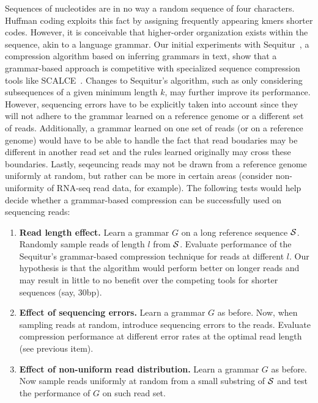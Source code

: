 \documentclass[12pt]{cmuthesis}
\begin{document}
  Sequences of nucleotides are in no way a random sequence of four characters. Huffman coding exploits this fact by assigning frequently appearing kmers shorter codes. However, it is conceivable that higher-order organization exists within the sequence, akin to a language grammar. Our initial experiments with Sequitur~\cite{Sequitur}, a compression algorithm based on inferring grammars in text, show that a grammar-based approach is competitive with specialized sequence compression tools like SCALCE~\cite{Sahinalp2012}. Changes to Sequitur's algorithm, such as only considering subsequences of a given minimum length $k$, may further improve its performance. However, sequencing errors have to be explicitly taken into account since they will not adhere to the grammar learned on a reference genome or a different set of reads. Additionally, a grammar learned on one set of reads (or on a reference genome) would have to be able to handle the fact that read boudaries may be different in another read set and the rules learned originally may cross these boundaries. Lastly, seqeuncing reads may not be drawn from a reference genome uniformly at random, but rather can be  more in certain areas (consider non-uniformity of RNA-seq read data, for example). The following tests would help decide whether a grammar-based compression can be successfully used on sequencing reads:
  \begin{enumerate}
    \item \textbf{Read length effect.} Learn a grammar $G$ on a long reference sequence $\mathcal{S}$. Randomly sample reads of length $l$ from $\mathcal{S}$. Evaluate performance of the Sequitur's grammar-based compression technique for reads at different $l$. Our hypothesis is that the algorithm would perform better on longer reads and may result in little to no benefit over the competing tools for shorter sequences (say, 30bp).

    \item \textbf{Effect of sequencing errors.} Learn a grammar $G$ as before. Now, when sampling reads at random, introduce sequencing errors to the reads. Evaluate compression performance at different error rates at the optimal read length (see previous item).

    \item \textbf{Effect of non-uniform read distribution.} Learn a grammar $G$ as before. Now sample reads uniformly at random from a small substring of $\mathcal{S}$ and test the performance of $G$ on such read set.
  \end{enumerate}
\end{document}
